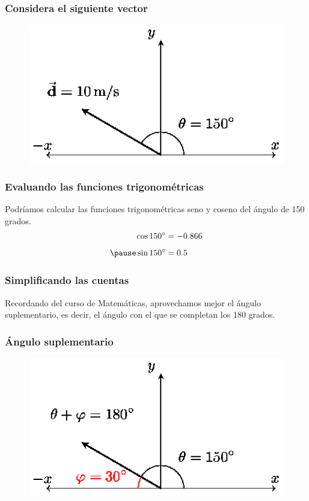\documentclass[14pt]{beamer}
\begin{document}
\begin{frame}
\frametitle{Considera el siguiente vector}
\begin{figure}
    \centering
    \includegraphics[scale=1.5]{Imagenes/Componentes_Vector_06.eps}
\end{figure}
\end{frame}
\begin{frame}
\frametitle{Evaluando las funciones trigonométricas}
Podríamos calcular las funciones trigonométricas seno y coseno del ángulo de 150 grados.
\pause
\begin{eqnarray*}
\begin{aligned}
\cos \ang{150} &= -0.866 \\[0.5em] \pause
\sin \ang{150} &= 0.5
\end{aligned}
\end{eqnarray*}
\end{frame}
\begin{frame}
\frametitle{Simplificando las cuentas}
Recordando del curso de Matemáticas, aprovechamos mejor el ángulo suplementario, es decir, \pause el ángulo con el que se completan los 180 grados.
\end{frame}
\begin{frame}
\frametitle{Ángulo suplementario}
\begin{figure}
    \centering
    \includegraphics[scale=1.5]{Imagenes/Componentes_Vector_07.eps}
\end{figure}
\end{frame}
\end{document}
